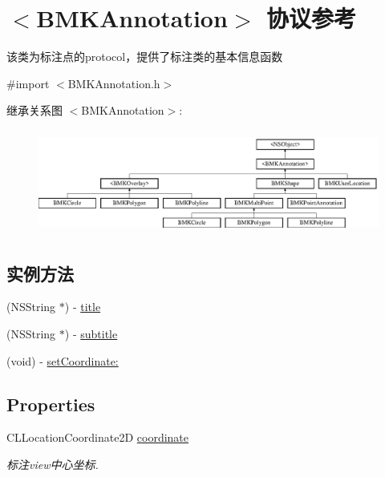 \hypertarget{protocol_b_m_k_annotation-p}{\section{$<$B\-M\-K\-Annotation$>$ 协议参考}
\label{protocol_b_m_k_annotation-p}
}


该类为标注点的protocol，提供了标注类的基本信息函数  




{\ttfamily \#import $<$B\-M\-K\-Annotation.\-h$>$}

继承关系图 $<$B\-M\-K\-Annotation$>$\-:\begin{figure}[H]
\begin{center}
\leavevmode
\includegraphics[height=3.456790cm]{protocol_b_m_k_annotation-p}
\end{center}
\end{figure}
\subsection*{实例方法}
\begin{DoxyCompactItemize}
\item 
(N\-S\-String $\ast$) -\/ \hyperlink{protocol_b_m_k_annotation-p_a249e1b880f8ded8541a0fe59ef4abb12}{title}
\item 
(N\-S\-String $\ast$) -\/ \hyperlink{protocol_b_m_k_annotation-p_a62aea71f4631251330e8a6fc3d3bdf11}{subtitle}
\item 
(void) -\/ \hyperlink{protocol_b_m_k_annotation-p_a86db1788af78d273e1e155d3aa3d978f}{set\-Coordinate\-:}
\end{DoxyCompactItemize}
\subsection*{Properties}
\begin{DoxyCompactItemize}
\item 
\hypertarget{protocol_b_m_k_annotation-p_ab7ed7fd80fc518acf82cf0048490f9be}{C\-L\-Location\-Coordinate2\-D \hyperlink{protocol_b_m_k_annotation-p_ab7ed7fd80fc518acf82cf0048490f9be}{coordinate}}\label{protocol_b_m_k_annotation-p_ab7ed7fd80fc518acf82cf0048490f9be}

\begin{DoxyCompactList}\small\item\em 标注view中心坐标. \end{DoxyCompactList}\end{DoxyCompactItemize}


